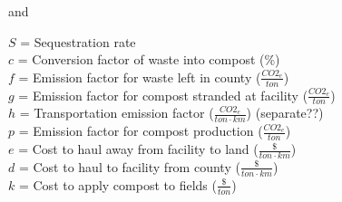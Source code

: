 \documentclass[12 pt,]{article}
\begin{document}
and

\(S\) = Sequestration rate\\
\(c\) = Conversion factor of waste into compost (\%)\\
\(f\) = Emission factor for waste left in county
(\(\frac {CO2_{e}}{ton}\))\\
\(g\) = Emission factor for compost stranded at facility
(\(\frac {CO2_{e}}{ton}\))\\
\(h\) = Transportation emission factor
(\(\frac {CO2_{e}}{ton \cdot km}\)) (separate??)\\
\(p\) = Emission factor for compost production
(\(\frac {CO2_{e}}{ton}\))\\
\(e\) = Cost to haul away from facility to land
(\(\frac {\$}{ton \cdot km}\))\\
\(d\) = Cost to haul to facility from county
(\(\frac {\$}{ton \cdot km}\))\\
\(k\) = Cost to apply compost to fields (\(\frac {\$}{ton}\))
\end{document}
